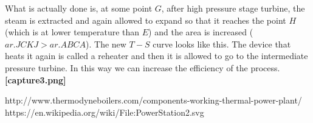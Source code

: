 \documentclass{report}
\begin{document}
\par What is actually done is, at some point $G$, after high pressure stage turbine, the steam is extracted and again allowed to expand so that it reaches the point $H$ (which is at lower temperature than $E$) and the area is increased ($ar. JCKJ > ar. ABCA$). The new $T-S$ curve looks like this. The device that heats it again is called a reheater and then it is allowed to go to the intermediate pressure turbine. In this way we can increase the efficiency of the process.
\\ {\bf [capture3.png]}

\begin{thebibliography}{999}
http://www.thermodyneboilers.com/components-working-thermal-power-plant/
https://en.wikipedia.org/wiki/File:PowerStation2.svg
\end{thebibliography}
\end{document}
